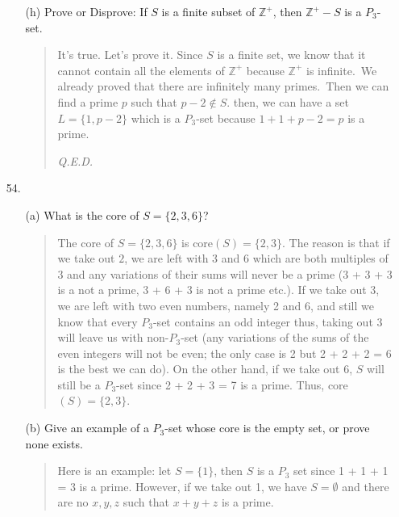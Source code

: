 \documentclass[12pt, a4paper]{article}                      %
\begin{document}
\begin{itemize}
\begin{itemize}
\item[]

\item[(h)]
Prove or Disprove: If $S$ is a finite subset of $\mathbb{Z}^+$, then $\mathbb{Z}^+ - S$ is a $P_3$-set.
\begin{quote}
It's true. Let's prove it. Since $S$ is a finite set, we know that it cannot contain all the elements of $\mathbb{Z}^+$ because $\mathbb{Z}^+$ is infinite.\ We already proved that there are infinitely many primes.\ Then we can find a prime $p$ such that $p - 2 \notin S$.
then, we can have a set $L = \{1, p - 2\}$ which is a $P_3$-set because $1 + 1 + p - 2 = p$ is a prime.
\begin{flushright}
\textit{Q.E.D.}
\end{flushright}
\end{quote}
\end{itemize}

\item[]
\item[]

\item[54.]
\begin{itemize}
If a subset $S$ of $\mathbb{Z}^+$ is a $P_3$-set then the \textbf{core} of $S$ is the set
$$\mbox{core}(S) := \{s \in S \mid S - \{s\} \mbox{ is not a $P_3$-set}\}.$$
\item[(a)]
What is the core of $S = \{2, 3, 6\}$?
\begin{quote}
The core of $S = \{2, 3, 6\}$ is core$(S) = \{2, 3\}$.
The reason is that if we take out $2$, we are left with 3 and 6 which are both multiples of 3 and any variations of their sums will never be a prime (3 + 3 + 3 is a not a prime, 3 + 6 + 3 is not a prime etc.).
If we take out 3, we are left with two even numbers, namely 2 and 6, and still we know that every $P_3$-set contains an odd integer thus, taking out 3 will leave us with non-$P_3$-set (any variations of the sums of the even integers will not be even; the only case is 2 but 2 + 2 + 2 = 6 is the best we can do). On the other hand, if we take out 6, $S$ will still be a $P_3$-set since 2 + 2 + 3 = 7 is a prime.
Thus, core$(S) = \{2, 3\}$.
\end{quote}

\item[]

\item[(b)]
Give an example of a $P_3$-set whose core is the empty set, or prove none exists.
\begin{quote}
Here is an example: let $S = \{1\}$, then $S$ is a $P_3$ set since 1 + 1 + 1 = 3 is a prime. However, if we take out 1, we have $S = \emptyset$
and there are no $x, y, z$ such that $x + y + z$ is a prime.
\end{quote}


\end{itemize}
\end{itemize}
\end{document}
